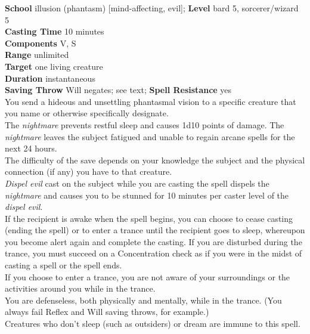 \textbf{School} illusion (phantasm) [mind-affecting, evil]; \textbf{Level} bard 5, sorcerer/wizard 5\\
\textbf{Casting Time} 10 minutes\\
\textbf{Components} V, S\\
\textbf{Range} unlimited\\
\textbf{Target} one living creature\\
\textbf{Duration} instantaneous\\
\textbf{Saving Throw }Will negates; see text; \textbf{Spell Resistance} yes\\
You send a hideous and unsettling phantasmal vision to a specific creature that you name or otherwise specifically designate.\\
The \textit{nightmare }prevents restful sleep and causes 1d10 points of damage. The \textit{nightmare }leaves the subject fatigued and unable to regain arcane spells for the next 24 hours.\\
The difficulty of the save depends on your knowledge the subject and the physical connection (if any) you have to that creature.\\
\textit{Dispel evil }cast on the subject while you are casting the spell dispels the \textit{nightmare }and causes you to be stunned for 10 minutes per caster level of the \textit{dispel evil}.\\
If the recipient is awake when the spell begins, you can choose to cease casting (ending the spell) or to enter a trance until the recipient goes to sleep, whereupon you become alert again and complete the casting. If you are disturbed during the trance, you must succeed on a Concentration check as if you were in the midst of casting a spell or the spell ends.\\
If you choose to enter a trance, you are not aware of your surroundings or the activities around you while in the trance.\\
You are defenseless, both physically and mentally, while in the trance. (You always fail Reflex and Will saving throws, for example.)\\
Creatures who don't sleep (such as outsiders) or dream are immune to this spell.\\
